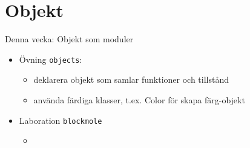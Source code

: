 \documentclass{lecturenotes}
\renewcommand{\vecka}{4}
\newcommand{\veckotema}{Objekt}
\begin{document}
\frame{\titlepage}
\setnextsection{\vecka}
\section[Vecka \vecka: \veckotema]{\veckotema}
\frame{\tableofcontents}

\ifkompendium\else
\begin{Slide}{Denna vecka: Objekt som moduler}
\begin{itemize}
\item Övning \texttt{objects}: 
\begin{itemize}
\item deklarera objekt som samlar funktioner och tillstånd
\item använda färdiga klasser, t.ex. Color för skapa färg-objekt
\end{itemize}

\item Laboration \texttt{blockmole}
\begin{itemize}
\item
\end{itemize}
\end{itemize}
\end{Slide}
\fi


\end{document}
